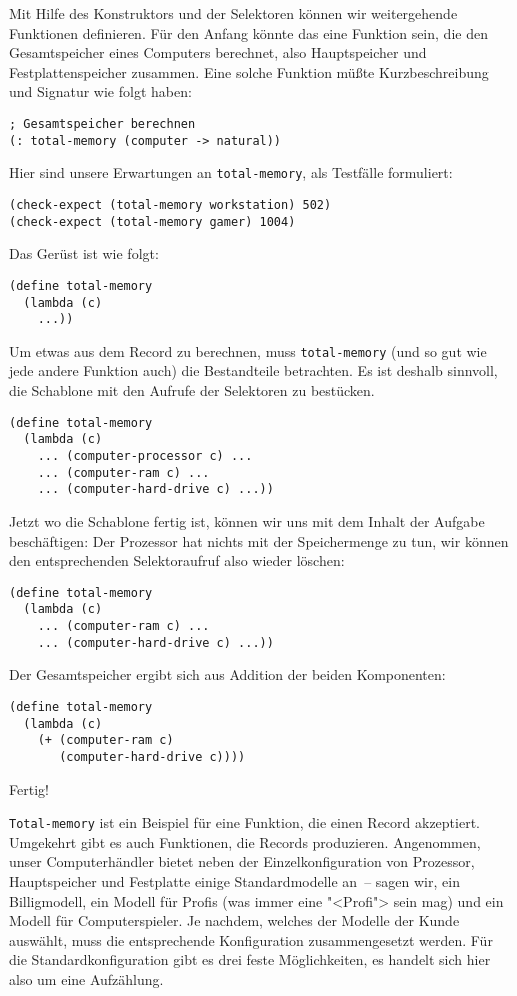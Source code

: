 Mit Hilfe des Konstruktors und der Selektoren können wir weitergehende
Funktionen definieren.
Für den Anfang könnte das
eine Funktion sein, die den Gesamtspeicher eines Computers berechnet,
also Hauptspeicher und Festplattenspeicher zusammen.
Eine solche Funktion müßte Kurzbeschreibung und Signatur wie folgt
haben: 
%
\begin{lstlisting}
; Gesamtspeicher berechnen
(: total-memory (computer -> natural))
\end{lstlisting}
%
Hier sind unsere Erwartungen an \lstinline{total-memory}, als Testfälle
formuliert:
%
\begin{lstlisting}
(check-expect (total-memory workstation) 502)
(check-expect (total-memory gamer) 1004)
\end{lstlisting}
% 
Das Gerüst ist wie folgt:
%
\begin{lstlisting}
(define total-memory
  (lambda (c)
    ...))
\end{lstlisting}
%
Um etwas aus dem Record zu berechnen, muss \lstinline{total-memory} (und
so gut wie jede andere Funktion auch) die Bestandteile betrachten.  Es
ist deshalb sinnvoll, die Schablone mit den Aufrufe der Selektoren zu
bestücken.
%
\begin{lstlisting}
(define total-memory
  (lambda (c)
    ... (computer-processor c) ...
    ... (computer-ram c) ...
    ... (computer-hard-drive c) ...))
\end{lstlisting}
%
Jetzt wo die Schablone fertig ist, können wir uns mit dem Inhalt der
Aufgabe beschäftigen: Der Prozessor hat nichts mit der
Speichermenge zu tun, wir können den entsprechenden Selektoraufruf
also wieder löschen:
%
\begin{lstlisting}
(define total-memory
  (lambda (c)
    ... (computer-ram c) ...
    ... (computer-hard-drive c) ...))
\end{lstlisting}
%
Der Gesamtspeicher ergibt sich aus Addition der beiden Komponenten:
%
\begin{lstlisting}
(define total-memory
  (lambda (c)
    (+ (computer-ram c)
       (computer-hard-drive c))))
\end{lstlisting}
%
Fertig!

\lstinline{Total-memory} ist ein Beispiel für eine Funktion, die einen
Record akzeptiert.  Umgekehrt gibt es auch Funktionen, die Records
produzieren.  Angenommen, unser Computerhändler bietet neben der
Einzelkonfiguration von Prozessor, Hauptspeicher und Festplatte einige
Standardmodelle an~-- sagen wir, ein Billigmodell, ein Modell für
Profis (was immer eine "<Profi"> sein mag) und ein Modell für
Computerspieler.  Je nachdem, welches der Modelle der Kunde auswählt,
muss die entsprechende Konfiguration zusammengesetzt werden.  Für die
Standardkonfiguration gibt es drei feste Möglichkeiten, es handelt
sich hier also um eine Aufzählung.

